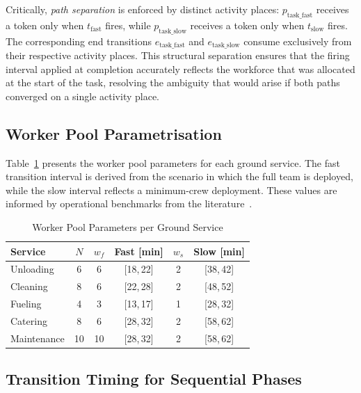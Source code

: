 \documentclass[conference,a4paper]{IEEEtran}
\begin{document}
Critically, \emph{path separation} is enforced by distinct activity places:
$p_{\mathrm{task\_fast}}$ receives a token only when $t_{\mathrm{fast}}$
fires, while $p_{\mathrm{task\_slow}}$ receives a token only when
$t_{\mathrm{slow}}$ fires. The corresponding end transitions
$e_{\mathrm{task\_fast}}$ and $e_{\mathrm{task\_slow}}$ consume exclusively
from their respective activity places. This structural separation ensures
that the firing interval applied at completion accurately reflects the
workforce that was allocated at the start of the task, resolving the
ambiguity that would arise if both paths converged on a single activity
place.

\subsection{Worker Pool Parametrisation}

Table~\ref{tab:pools} presents the worker pool parameters for each ground
service. The fast transition interval is derived from the scenario in which
the full team is deployed, while the slow interval reflects a minimum-crew
deployment. These values are informed by operational benchmarks from the
literature~\cite{ref8,ref11,ref15}.

\begin{table}[htbp]
\caption{Worker Pool Parameters per Ground Service}
\label{tab:pools}
\centering
\setlength{\tabcolsep}{4pt}
\begin{tabular}{@{}lccccc@{}}
\toprule
\textbf{Service}
  & \textbf{$N$}
  & \textbf{$w_f$}
  & \textbf{Fast [min]}
  & \textbf{$w_s$}
  & \textbf{Slow [min]} \\
\midrule
Unloading    & 6  & 6  & [18,\,22] & 2 & [38,\,42] \\
Cleaning     & 8  & 6  & [22,\,28] & 2 & [48,\,52] \\
Fueling      & 4  & 3  & [13,\,17] & 1 & [28,\,32] \\
Catering     & 8  & 6  & [28,\,32] & 2 & [58,\,62] \\
Maintenance  & 10 & 10 & [28,\,32] & 2 & [58,\,62] \\
\bottomrule
\end{tabular}
\end{table}

\subsection{Transition Timing for Sequential Phases}
\end{document}
